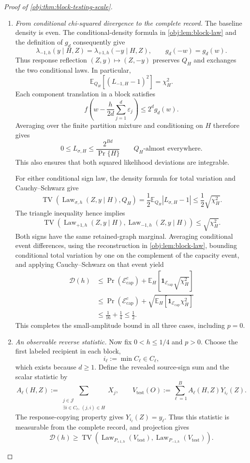 \documentclass[11pt]{article}
\begin{document}
\begin{proof}[Proof of \cref{obj:thm:block-testing-scale}]
\begin{enumerate}
\item \textit{From conditional chi-squared divergence to the complete record.}
The baseline density is even. The conditional-density formula in
\cref{obj:lem:block-law} and the definition of \(g_d\) consequently give
\[
\lambda_{-1,h}(y\mid H,Z)
=
\lambda_{+1,h}(-y\mid H,Z),
\qquad
g_d(-w)=g_d(w).
\]
Thus response reflection \((Z,y)\mapsto(Z,-y)\) preserves \(Q_H\) and exchanges the two conditional laws. In particular,
\[
\mathbb E_{Q_H}[(L_{-1,H}-1)^2]=\chi_H^2.
\]
Each component translation in a block satisfies
\[
f\!\left(w-\frac h{2d}\sum_{j=1}^{d}\varepsilon_j\right)
\le2^d g_d(w).
\]
Averaging over the finite partition mixture and conditioning on \(H\) therefore gives
\[
0\le L_{\sigma,H}\le\frac{2^{Bd}}{\Pr\{H\}}
\qquad Q_H\text{-almost everywhere}.
\]
This also ensures that both squared likelihood deviations are integrable.

For either conditional sign law, the density formula for total variation and Cauchy--Schwarz give
\[
\operatorname{TV}\!\left(
\operatorname{Law}_{\sigma,h}(Z,y\mid H),Q_H
\right)
=
\frac12\mathbb E_{Q_H}|L_{\sigma,H}-1|
\le\frac12\sqrt{\chi_H^2}.
\]
The triangle inequality hence implies
\[
\operatorname{TV}\!\left(
\operatorname{Law}_{+1,h}(Z,y\mid H),
\operatorname{Law}_{-1,h}(Z,y\mid H)
\right)
\le\sqrt{\chi_H^2}.
\]
Both signs have the same retained-graph marginal. Averaging conditional event differences, using the reconstruction in
\cref{obj:lem:block-law}, bounding conditional total variation by one on the complement of the capacity event, and applying Cauchy--Schwarz on that event yield
\[
\begin{aligned}
\mathcal D(h)
&\le
\Pr(\mathcal E_{\mathrm{cap}}^c)
+
\mathbb E_H[
\mathbf1_{\mathcal E_{\mathrm{cap}}}\sqrt{\chi_H^2}]\\
&\le
\Pr(\mathcal E_{\mathrm{cap}}^c)
+
\sqrt{\mathbb E_H[
\mathbf1_{\mathcal E_{\mathrm{cap}}}\chi_H^2]}\\
&\le\frac1{16}+\frac14
\le\frac12.
\end{aligned}
\]
This completes the small-amplitude bound in all three cases, including \(p=0\).

\item \textit{An observable reverse statistic.}
Now fix \(0<h\le1/4\) and \(p>0\). Choose the first labeled recipient in each block,
\[
i_\ell:=\min C_\ell\in C_\ell,
\]
which exists because \(d\ge1\). Define the revealed source-sign sum and the scalar statistic by
\[
A_\ell(H,Z):=
\sum_{\substack{j\in\mathcal J\\
\exists i\in C_\ell,\ (j,i)\in H}}X_j,
\qquad
V_{\mathrm{test}}(O):=
\sum_{\ell=1}^{B}A_\ell(H,Z)Y_{i_\ell}(Z).
\]
The response-copying property gives \(Y_{i_\ell}(Z)=y_\ell\). Thus this statistic is measurable from the complete record, and projection gives
\[
\mathcal D(h)\ge
\operatorname{TV}\!\left(
\operatorname{Law}_{P_{+1,h}}(V_{\mathrm{test}}),
\operatorname{Law}_{P_{-1,h}}(V_{\mathrm{test}})
\right).
\]


\end{enumerate}
\end{proof}
\end{document}

